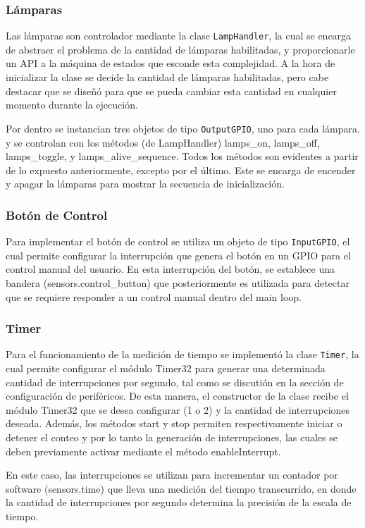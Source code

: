 \subsubsection{Lámparas}
Las lámparas son controlador mediante la clase \texttt{LampHandler}, la cual se encarga de abstraer
el problema de la cantidad de lámparas habilitadas, y proporcionarle un API a la máquina de estados
que esconde esta complejidad. A la hora de inicializar la clase se decide la cantidad de lámparas
habilitadas, pero cabe destacar que se diseñó para que se pueda cambiar esta cantidad en cualquier
momento durante la ejecución.

Por dentro se instancian tres objetos de tipo \texttt{OutputGPIO}, uno para cada lámpara. y se
controlan con los métodos (de LampHandler) lamps\_on, lamps\_off, lamps\_toggle, y
lamps\_alive\_sequence. Todos los métodos son evidentes a partir de lo expuesto anteriormente,
excepto por el último. Este se encarga de encender y apagar la lámparas para mostrar la secuencia de
inicialización.

 
\subsubsection{Botón de Control}
Para implementar el botón de control se utiliza un objeto de tipo \texttt{InputGPIO}, el cual
permite configurar la interrupción que genera el botón en un GPIO para el control manual del
usuario. En esta interrupción del botón, se establece una bandera (sensors.control\_button) que
posteriormente es utilizada para detectar que se requiere responder a un control manual dentro del
main loop.

\subsubsection{Timer}
Para el funcionamiento de la medición de tiempo se implementó la clase \texttt{Timer}, la cual
permite configurar el módulo Timer32 para generar una determinada cantidad de interrupciones por
segundo, tal como se discutión en la sección de configuración de periféricos. De esta manera, el
constructor de la clase recibe el módulo Timer32 que se desea configurar (1 o 2) y la cantidad de
interrupciones deseada. Además, los métodos start y stop permiten respectivamente iniciar o detener
el conteo y por lo tanto la generación de interrupciones, las cuales se deben previamente activar
mediante el método enableInterrupt. 

En este caso, las interrupciones se utilizan para incrementar un contador por software
(sensors.time) que lleva una medición del tiempo transcurrido, en donde la cantidad de
interrupciones por segundo determina la precisión de la escala de tiempo.

